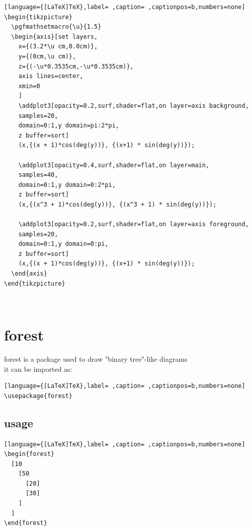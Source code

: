 \documentclass[a4paper,12pt]{article}
\begin{document}
\begin{lstlisting}[language={[LaTeX]TeX},label= ,caption= ,captionpos=b,numbers=none]
\begin{tikzpicture}
  \pgfmathsetmacro{\u}{1.5}
  \begin{axis}[set layers,
    x={(3.2*\u cm,0.0cm)}, 
    y={(0cm,\u cm)},
    z={(-\u*0.3535cm,-\u*0.3535cm)},  
    axis lines=center,
    xmin=0
    ]
    \addplot3[opacity=0.2,surf,shader=flat,on layer=axis background,
    samples=20,
    domain=0:1,y domain=pi:2*pi,
    z buffer=sort]
    (x,{(x + 1)*cos(deg(y))}, {(x+1) * sin(deg(y))});

    \addplot3[opacity=0.4,surf,shader=flat,on layer=main,
    samples=40,
    domain=0:1,y domain=0:2*pi,
    z buffer=sort]
    (x,{(x^3 + 1)*cos(deg(y))}, {(x^3 + 1) * sin(deg(y))});

    \addplot3[opacity=0.2,surf,shader=flat,on layer=axis foreground,
    samples=20,
    domain=0:1,y domain=0:pi,
    z buffer=sort]
    (x,{(x + 1)*cos(deg(y))}, {(x+1) * sin(deg(y))});
  \end{axis}
\end{tikzpicture}
\end{lstlisting}

\\[0pt]

\section{forest}
\label{sec:org854c873}

forest is a package used to draw "binary tree"-like diagrams\\[0pt]
it can be imported as:\\[0pt]

\begin{lstlisting}[language={[LaTeX]TeX},label= ,caption= ,captionpos=b,numbers=none]
\usepackage{forest}
\end{lstlisting}

\subsection{usage}
\label{sec:org3df7d9d}

\begin{lstlisting}[language={[LaTeX]TeX},label= ,caption= ,captionpos=b,numbers=none]
\begin{forest}
  [10
    [50
      [20]
      [30]
    ]
  ]
\end{forest}
\end{lstlisting}
\end{document}
